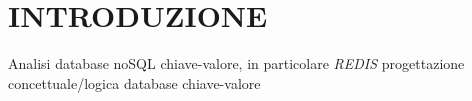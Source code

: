 \chapter*{INTRODUZIONE}
Analisi database noSQL chiave-valore, in particolare \emph{REDIS}
progettazione concettuale/logica database chiave-valore
